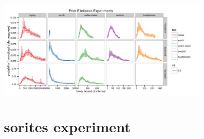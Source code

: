 \documentclass[10pt]{article}
\begin{document}
    \includegraphics[width=0.8\textwidth]{all_bins_priors.pdf}
    
%     
%     
% 

\section{sorites experiment}
\end{document}
